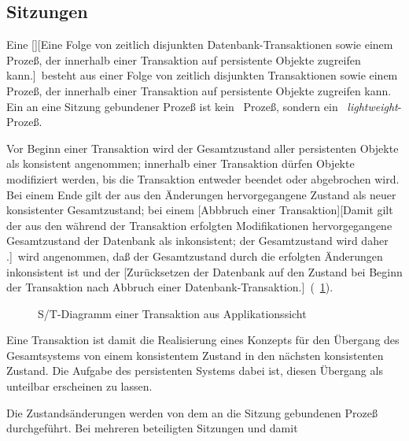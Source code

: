 \subsection{Sitzungen}%
%
Eine [][Eine Folge von zeitlich
disjunkten Da\-ten\-bank-Trans\-ak\-tio\-nen sowie einem Proze\ss{}, der
innerhalb einer Transaktion auf persistente Objekte zugreifen
kann.]\ besteht aus  einer Folge von zeitlich disjunkten Transaktionen
sowie einem Proze\ss{}, der innerhalb einer Transaktion auf persistente
Objekte zugreifen kann. Ein an eine Sitzung gebundener Proze\ss{} ist
kein \unix\ Proze\ss{}, sondern ein \lw\ {\em lightweight\/}-Proze\ss{}.
%
\par{}Vor Beginn einer Transaktion wird der Gesamtzustand aller
persistenten Objekte als konsistent angenommen; innerhalb einer
Transaktion d\"{u}rfen Objekte modifiziert werden, bis die Transaktion
entweder beendet oder abgebrochen wird. Bei einem Ende gilt der aus
den \"{A}n\-de\-run\-gen hervorgegangene Zustand als neuer konsistenter
Gesamtzustand; bei einem [Abbbruch einer
Transaktion][Damit gilt der aus den w\"{a}hrend der Transaktion
erfolgten Modifikationen hervorgegangene Gesamtzustand der Datenbank
als inkonsistent; der Gesamtzustand wird daher \protect{}.]\ wird angenommen, da\ss{} der
Gesamtzustand durch die erfolgten \"{A}n\-de\-run\-gen inkonsistent ist
und der [Zur\"{u}cksetzen
der Datenbank auf den Zustand bei Beginn der Transaktion nach Abbruch
einer Datenbank-Transaktion.]\ (\figurename~\ref{fig:sttrans}). %
%
\begin{figure}[htbp]%
\ifbuch%
\centerline{}%
\else%
\centerline{}%
\fi%
\captionfrom%
 {S/T-Diagramm einer Transaktion aus Applikationssicht}%
 {\cite[]{bib:gr93}}%
\label{fig:sttrans}%
\end{figure}%
%
Eine Transaktion ist damit die Realisierung eines Konzepts f\"{u}r den
\"{U}ber\-gang des Gesamtsystems von einem konsistentem Zustand in den
n\"{a}chsten konsistenten Zustand. Die Aufgabe des persistenten Systems
dabei ist, diesen \"{U}bergang als unteilbar erscheinen zu lassen.
%
\par{}Die Zustands\"{a}nderungen werden von dem an die Sitzung gebundenen
Proze\ss{} durchgef\"{u}hrt. Bei mehreren beteiligten Sitzungen und damit
